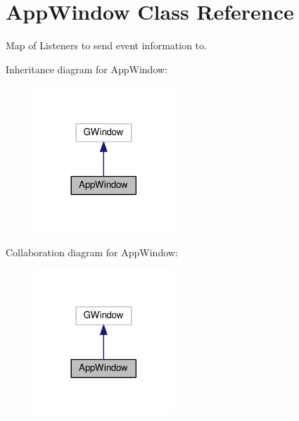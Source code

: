 \hypertarget{classAppWindow}{}\section{App\+Window Class Reference}
\label{classAppWindow}


Map of Listeners to send event information to.  




Inheritance diagram for App\+Window\+:
\nopagebreak
\begin{figure}[H]
\begin{center}
\leavevmode
\includegraphics[width=149pt]{classAppWindow__inherit__graph}
\end{center}
\end{figure}


Collaboration diagram for App\+Window\+:
\nopagebreak
\begin{figure}[H]
\begin{center}
\leavevmode
\includegraphics[width=149pt]{classAppWindow__coll__graph}
\end{center}
\end{figure}
